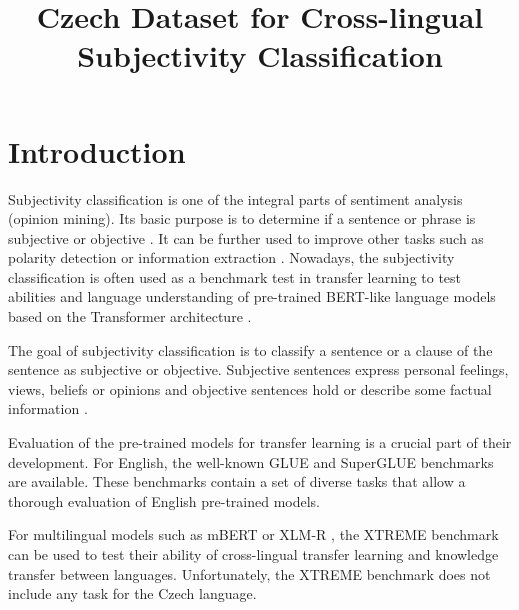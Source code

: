 \documentclass[10pt, a4paper]{article}
\title{Czech Dataset for Cross-lingual Subjectivity Classification}
\begin{document}
\maketitleabstract











\section{Introduction}
Subjectivity classification \cite{wiebe-etal-1999-development} is one of the integral parts of sentiment analysis (opinion mining). Its basic purpose is to determine if a sentence or phrase is subjective or objective \cite{liu2012sentiment}. It can be further used to improve other tasks such as polarity detection or information extraction \cite{wiebe-etal-1999-development,english-dataset}. Nowadays, the subjectivity classification is often used as a benchmark test \cite{zhao2015self-adasent,reimers-gurevych-2019-sentence,wang2021entailment-few-shot-learner,bragg2021flex} in transfer learning to test abilities and language understanding of pre-trained BERT-like language models based on the Transformer architecture \cite{attention-all-transformer}.


\par The goal of subjectivity classification is to classify a sentence or a clause of the sentence as subjective or objective. Subjective sentences express personal feelings, views, beliefs or opinions and objective sentences hold or describe some factual information \cite{liu2012sentiment}.

\par Evaluation of the pre-trained models for transfer learning is a crucial part of their development. For English, the well-known GLUE \cite{wang-etal-2018-glue} and SuperGLUE \cite{superglue} benchmarks are available. These benchmarks contain a set of diverse tasks that allow a thorough evaluation of English pre-trained models. 

\par For multilingual models such as mBERT \cite{devlin-etal-2019-bert} or XLM-R \cite{xlm-r}, the XTREME \cite{pmlr-v119-hu20b-xtreme} benchmark can be used to test their ability of cross-lingual transfer learning and knowledge transfer between languages. Unfortunately, the XTREME benchmark does not include any task for the Czech language.
\end{document}
